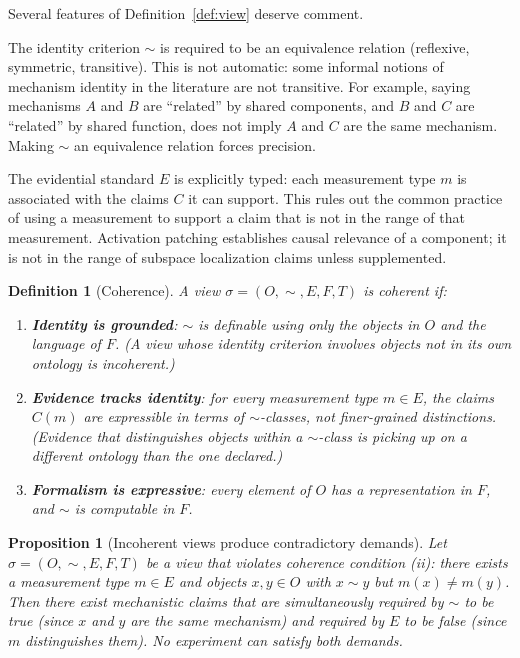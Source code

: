 \documentclass[11pt]{article}
\newtheorem{definition}{Definition}[section]
\newtheorem{proposition}{Proposition}[section]
\theoremstyle{remark}
\newcommand{\view}{\sigma}
\begin{document}
Several features of Definition~\ref{def:view} deserve comment.

The identity criterion $\sim$ is required to be an equivalence relation
(reflexive, symmetric, transitive).  This is not automatic: some
informal notions of mechanism identity in the literature are not
transitive.  For example, saying mechanisms $A$ and $B$ are ``related''
by shared components, and $B$ and $C$ are ``related'' by shared
function, does not imply $A$ and $C$ are the same mechanism.  Making
$\sim$ an equivalence relation forces precision.

The evidential standard $E$ is explicitly typed: each measurement type
$m$ is associated with the claims $C$ it can support.  This rules out
the common practice of using a measurement to support a claim that is
not in the range of that measurement.  Activation patching establishes
causal relevance of a component; it is not in the range of subspace
localization claims unless supplemented.

\begin{definition}[Coherence]\label{def:coherence}
A view $\view = (O, {\sim}, E, F, T)$ is \emph{coherent} if:
\begin{enumerate}[leftmargin=*, label=(\roman*)]
\item \textbf{Identity is grounded}: $\sim$ is definable using only
      the objects in $O$ and the language of $F$.  (A view whose
      identity criterion involves objects not in its own ontology is
      incoherent.)
\item \textbf{Evidence tracks identity}: for every measurement type
      $m \in E$, the claims $C(m)$ are expressible in terms of $\sim$-classes,
      not finer-grained distinctions.  (Evidence that distinguishes objects
      within a $\sim$-class is picking up on a different ontology than
      the one declared.)
\item \textbf{Formalism is expressive}: every element of $O$ has a
      representation in $F$, and $\sim$ is computable in $F$.
\end{enumerate}
\end{definition}

\begin{proposition}[Incoherent views produce contradictory demands]\label{prop:incoherence}
Let $\view = (O, {\sim}, E, F, T)$ be a view that violates coherence
condition (ii): there exists a measurement type $m \in E$ and objects
$x, y \in O$ with $x \sim y$ but $m(x) \neq m(y)$.  Then there exist
mechanistic claims that are simultaneously required by $\sim$ to be true
(since $x$ and $y$ are the same mechanism) and required by $E$ to be
false (since $m$ distinguishes them).  No experiment can satisfy both
demands.
\end{proposition}
\end{document}

